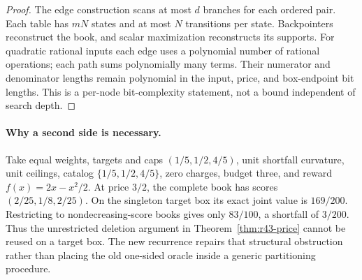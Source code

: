 \begin{proof}
The edge construction scans at most $d$ branches for each ordered pair. Each table has $mN$ states and at most $N$ transitions per state. Backpointers reconstruct the book, and scalar maximization reconstructs its supports. For quadratic rational inputs each edge uses a polynomial number of rational operations; each path sums polynomially many terms. Their numerator and denominator lengths remain polynomial in the input, price, and box-endpoint bit lengths. This is a per-node bit-complexity statement, not a bound independent of search depth.
\end{proof}

\paragraph{Why a second side is necessary.}
Take equal weights, targets and caps $(1/5,1/2,4/5)$, unit shortfall curvature, unit ceilings, catalog $\{1/5,1/2,4/5\}$, zero charges, budget three, and reward $f(x)=2x-x^2/2$. At price $3/2$, the complete book has scores $(2/25,1/8,2/25)$. On the singleton target box its exact joint value is $169/200$. Restricting to nondecreasing-score books gives only $83/100$, a shortfall of $3/200$. Thus the unrestricted deletion argument in Theorem~\ref{thm:r43-price} cannot be reused on a target box. The new recurrence repairs that structural obstruction rather than placing the old one-sided oracle inside a generic partitioning procedure.
